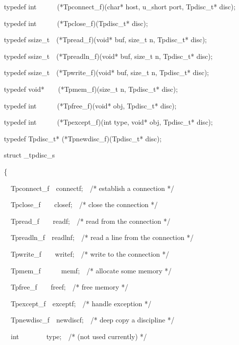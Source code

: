 \bigskip

{\ttfamily\mdseries
typedef int\ \ \ \ \ \ (*Tpconnect\_f)(char* host, u\_short port, Tpdisc\_t* disc);}

{\ttfamily\mdseries
typedef int\ \ \ \ \ \ (*Tpclose\_f)(Tpdisc\_t* disc);}

{\ttfamily\mdseries
typedef ssize\_t\ \ (*Tpread\_f)(void* buf, size\_t n, Tpdisc\_t* disc);}

{\ttfamily\mdseries
typedef ssize\_t\ \ (*Tpreadln\_f)(void* buf, size\_t n, Tpdisc\_t* disc);}

{\ttfamily\mdseries
typedef ssize\_t\ \ (*Tpwrite\_f)(void* buf, size\_t n, Tpdisc\_t* disc);}

{\ttfamily\mdseries
typedef void*\ \ \ \ (*Tpmem\_f)(size\_t n, Tpdisc\_t* disc);}

{\ttfamily\mdseries
typedef int\ \ \ \ \ \ (*Tpfree\_f)(void* obj, Tpdisc\_t* disc);}

{\ttfamily\mdseries
typedef int\ \ \ \ \ \ (*Tpexcept\_f)(int type, void* obj, Tpdisc\_t* disc);}

{\ttfamily\mdseries
typedef Tpdisc\_t* (*Tpnewdisc\_f)(Tpdisc\_t* disc);}


\bigskip

{\ttfamily\mdseries
struct \_tpdisc\_s}

{\ttfamily\mdseries
\{}

{\ttfamily\mdseries
\ \ Tpconnect\_f\ \ connectf;\ \ /* establish a connection */}

{\ttfamily\mdseries
\ \ Tpclose\_f\ \ \ \ closef;\ \ /* close the connection */}

{\ttfamily\mdseries
\ \ Tpread\_f\ \ \ \ readf;\ \ /* read from the connection */}

{\ttfamily\mdseries
\ \ Tpreadln\_f\ \ readlnf;\ \ /* read a line from the connection */}

{\ttfamily\mdseries
\ \ Tpwrite\_f\ \ \ \ writef;\ \ /* write to the connection */}

{\ttfamily\mdseries
\ \ Tpmem\_f\ \ \ \ \ \ memf;\ \ /* allocate some memory */}

{\ttfamily\mdseries
\ \ Tpfree\_f\ \ \ \ freef;\ \ /* free memory */}

{\ttfamily\mdseries
\ \ Tpexcept\_f\ \ exceptf;\ \ /* handle exception */}

{\ttfamily\mdseries
\ \ Tpnewdisc\_f\ \ newdiscf;\ \ /* deep copy a discipline */}

{\ttfamily\mdseries
\ \ int\ \ \ \ \ \ \ \ type;\ \ /* (not used currently) */}

